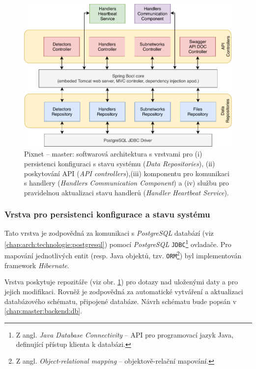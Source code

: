 \begin{figure}[h]
	\begin{center}
		\vspace*{0.4cm}
		\includegraphics[width=14cm]{figures/master_arch.pdf}
		\caption{Pixnet -- master: softwarová architektura s vrstvami pro (i) persistenci konfiguraci s stavu systému (\textit{Data Repositories}), (ii) poskytování API (\textit{API controllers}),(iii) komponentu pro komunikaci s handlery (\textit{Handlers Communication Component}) a (iv) službu pro pravidelnou aktualizaci stavu handlerů (\textit{Handler Heartbeat Service}).}
		\label{fig:master:arch}
	\end{center}
\end{figure}

\subsubsection{Vrstva pro persistenci konfigurace a stavu systému}
Tato vrstva je zodpovědná za komunikaci s \textit{PostgreSQL} databází (viz \ref{chap:arch:technologie:postgresql}) pomocí \textit{PostgreSQL} \texttt{JDBC}\footnote{Z angl. \textit{Java Database Connectivity} -- API pro programovací jazyk Java, definující přístup klienta k databázi.} ovladače. Pro mapování jednotlivých entit (resp. Java objektů, tzv. \texttt{ORM}\footnote{Z angl. \textit{Object-relational mapping} -- objektově-relační mapování.}) byl implementován framework \textit{Hibernate}.

Vrstva poskytuje repozitáře (viz obr. \ref{fig:master:arch}) pro dotazy nad uloženými daty a pro jejich modifikaci. Rovněž je zodpovědná za automatické vytváření a aktualizaci databázového schématu, připojené databáze. Návrh schématu bude popsán v \ref{chap:master:backend:db}.


